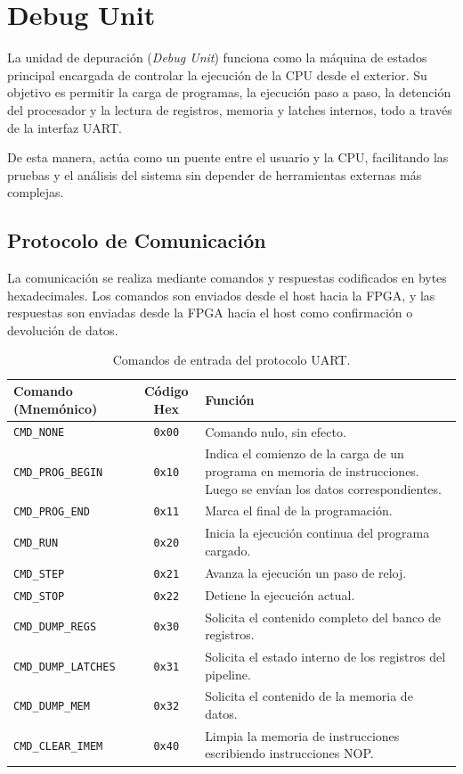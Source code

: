 \section{Debug Unit}

La unidad de depuración (\textit{Debug Unit}) funciona como la máquina de estados principal encargada de controlar la ejecución de la CPU desde el exterior. Su objetivo es permitir la carga de programas, la ejecución paso a paso, la detención del procesador y la lectura de registros, memoria y latches internos, todo a través de la interfaz UART.

De esta manera, actúa como un puente entre el usuario y la CPU, facilitando las pruebas y el análisis del sistema sin depender de herramientas externas más complejas.

\subsection{Protocolo de Comunicación}
La comunicación se realiza mediante comandos y respuestas codificados en bytes hexadecimales. Los comandos son enviados desde el host hacia la FPGA, y las respuestas son enviadas desde la FPGA hacia el host como confirmación o devolución de datos.

\begin{table}[h]
\centering
\begin{tabular}{|l|c|p{8.5cm}|}
\hline
\textbf{Comando (Mnemónico)} & \textbf{Código Hex} & \textbf{Función} \\ \hline
\texttt{CMD\_NONE} & \texttt{0x00} & Comando nulo, sin efecto. \\ \hline
\texttt{CMD\_PROG\_BEGIN} & \texttt{0x10} & Indica el comienzo de la carga de un programa en memoria de instrucciones. Luego se envían los datos correspondientes. \\ \hline
\texttt{CMD\_PROG\_END} & \texttt{0x11} & Marca el final de la programación. \\ \hline
\texttt{CMD\_RUN} & \texttt{0x20} & Inicia la ejecución continua del programa cargado. \\ \hline
\texttt{CMD\_STEP} & \texttt{0x21} & Avanza la ejecución un paso de reloj. \\ \hline
\texttt{CMD\_STOP} & \texttt{0x22} & Detiene la ejecución actual. \\ \hline
\texttt{CMD\_DUMP\_REGS} & \texttt{0x30} & Solicita el contenido completo del banco de registros. \\ \hline
\texttt{CMD\_DUMP\_LATCHES} & \texttt{0x31} & Solicita el estado interno de los registros del pipeline. \\ \hline
\texttt{CMD\_DUMP\_MEM} & \texttt{0x32} & Solicita el contenido de la memoria de datos. \\ \hline
\texttt{CMD\_CLEAR\_IMEM} & \texttt{0x40} & Limpia la memoria de instrucciones escribiendo instrucciones NOP. \\ \hline
\end{tabular}
\caption{Comandos de entrada del protocolo UART.}
\end{table}

